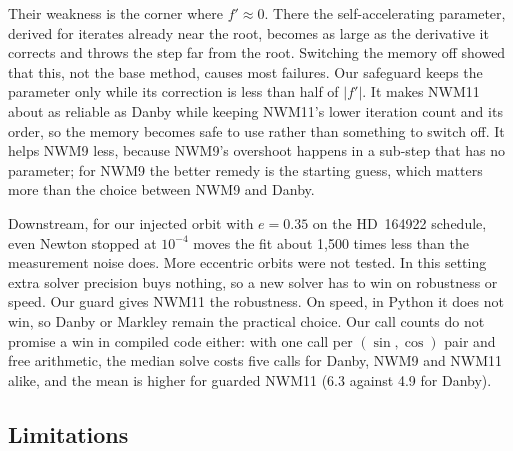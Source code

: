 \documentclass[sigconf,nonacm]{acmart}
\begin{document}
Their weakness is the corner where $f' \approx 0$. There the
self-accelerating parameter, derived for iterates already near the root,
becomes as large as the derivative it corrects and throws the step far
from the root.
Switching the memory off showed that this, not the base method, causes
most failures. Our safeguard keeps the parameter only while its
correction is less than half of $|f'|$. It makes NWM11 about as reliable
as Danby while keeping NWM11's lower iteration count and its order, so the
memory becomes safe to use rather than something to switch off. It helps
NWM9 less, because NWM9's overshoot happens in a sub-step that has no
parameter; for NWM9 the better remedy is the starting guess, which
matters more than the choice between NWM9 and Danby.

Downstream, for our injected orbit with $e = 0.35$ on the HD~164922
schedule, even Newton stopped at $10^{-4}$ moves the fit about 1{,}500
times less than the measurement noise does. More eccentric orbits were
not tested. In this setting extra solver precision buys nothing, so a
new solver has to win on robustness or speed. Our guard gives NWM11 the
robustness. On speed, in Python it does not win, so Danby or Markley remain the practical
choice. Our call counts do not promise a win in compiled code either:
with one call per $(\sin,\cos)$ pair and free arithmetic, the median solve
costs five calls for Danby, NWM9 and NWM11 alike, and the mean is higher
for guarded NWM11 (6.3 against 4.9 for Danby).

\subsection{Limitations}
\end{document}
